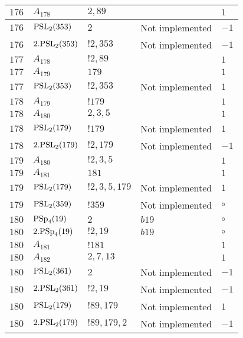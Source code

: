 \documentclass[a4paper, 11pt]{article}
\begin{document}
\begin{longtable}{lllll}
        $ 176 $ & $ A_{178} $ & $ 2, 89 $ & $ ~ $ & $ 1$ \\ \hline
        $ 176 $ & $ {\rm PSL}_{2}(353) $ & $ 2 $ &  Not implemented & $ -1$ \\ \hline
        $ 176 $ & $ 2.{\rm PSL}_{2}(353) $ & $ !2, 353 $ &  Not implemented & $ -1$ \\ \hline
        $ 177 $ & $ A_{178} $ & $ !2, 89 $ & $ ~ $ & $ 1$ \\ \hline
        $ 177 $ & $ A_{179} $ & $ 179 $ & $ ~ $ & $ 1$ \\ \hline
        $ 177 $ & $ {\rm PSL}_{2}(353) $ & $ !2, 353 $ &  Not implemented & $ 1$ \\ \hline
        $ 178 $ & $ A_{179} $ & $ !179 $ & $ ~ $ & $ 1$ \\ \hline
        $ 178 $ & $ A_{180} $ & $ 2, 3, 5 $ & $ ~ $ & $ 1$ \\ \hline
        $ 178 $ & $ {\rm PSL}_{2}(179) $ & $ !179 $ &  Not implemented & $ 1$ \\ \hline
        $ 178 $ & $ 2.{\rm PSL}_{2}(179) $ & $ !2, 179 $ &  Not implemented & $ -1$ \\ \hline
        $ 179 $ & $ A_{180} $ & $ !2, 3, 5 $ & $ ~ $ & $ 1$ \\ \hline
        $ 179 $ & $ A_{181} $ & $ 181 $ & $ ~ $ & $ 1$ \\ \hline
        $ 179 $ & $ {\rm PSL}_{2}(179) $ & $ !2, 3, 5, 179 $ &  Not implemented & $ 1$ \\ \hline
        $ 179 $ & $ {\rm PSL}_{2}(359) $ & $ !359 $ &  Not implemented &  $\circ$ \\ \hline
        $ 180 $ & $ {\rm PSp}_{4}(19) $ & $ 2 $ & $ b19 $ &  $\circ$ \\ \hline
        $ 180 $ & $ 2.{\rm PSp}_{4}(19) $ & $ ! 2,19 $ & $ b19 $ &  $\circ$ \\ \hline
        $ 180 $ & $ A_{181} $ & $ !181 $ & $ ~ $ & $ 1$ \\ \hline
        $ 180 $ & $ A_{182} $ & $ 2, 7, 13 $ & $ ~ $ & $ 1$ \\ \hline
        $ 180 $ & $ {\rm PSL}_{2}(361) $ & $ 2 $ &  Not implemented & $ -1$ \\ \hline
        $ 180 $ & $ 2.{\rm PSL}_{2}(361) $ & $ !2, 19 $ &  Not implemented & $ -1$ \\ \hline
        $ 180 $ & $ {\rm PSL}_{2}(179) $ & $ !89, 179 $ &  Not implemented & $ 1$ \\ \hline
        $ 180 $ & $ 2.{\rm PSL}_{2}(179) $ & $ !89, 179, 2 $ &  Not implemented & $ -1$ \\ \hline

\end{longtable}
\end{document}
